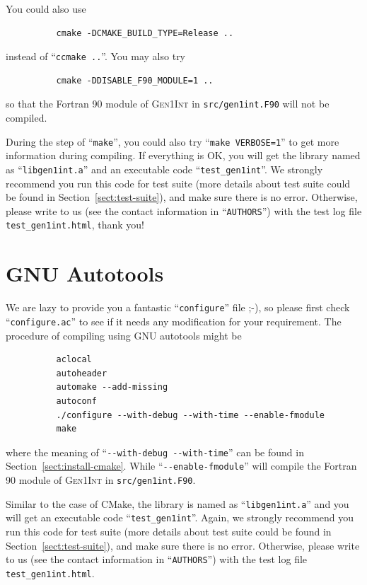 \documentclass[a4paper,11pt,twoside,openright]{book}
\begin{document}
You could also use 
\begin{verbatim}
          cmake -DCMAKE_BUILD_TYPE=Release ..
\end{verbatim}
instead of ``\verb|ccmake ..|''. You may also try
\begin{verbatim}
          cmake -DDISABLE_F90_MODULE=1 ..
\end{verbatim}
so that the Fortran 90 module of \textsc{Gen1Int} in \verb|src/gen1int.F90| will not be compiled.

During the step of ``\verb|make|'', you could also try ``\verb|make VERBOSE=1|'' to get more information
during compiling. If everything is OK, you will get the library named as ``\verb|libgen1int.a|'' and an executable
code ``\verb|test_gen1int|''. We strongly recommend you run this code for test suite (more details about
test suite could be found in Section~\ref{sect:test-suite}), and make sure there is no error. Otherwise,
please write to us (see the contact information in ``\verb|AUTHORS|'') with the test log file
\verb|test_gen1int.html|, thank you!

\section{GNU Autotools}
\label{sect:install-gnu}

We are lazy to provide you a fantastic ``\verb|configure|'' file ;-), so please first check ``\verb|configure.ac|'' to
see if it needs any modification for your requirement. The procedure of compiling using GNU autotools might be
\begin{verbatim}
          aclocal
          autoheader
          automake --add-missing
          autoconf
          ./configure --with-debug --with-time --enable-fmodule
          make
\end{verbatim}
where the meaning of ``\verb|--with-debug --with-time|'' can be found in Section~\ref{sect:install-cmake}.
While ``\verb|--enable-fmodule|'' will compile the Fortran 90 module of \textsc{Gen1Int} in \verb|src/gen1int.F90|.

Similar to the case of CMake, the library is named as ``\verb|libgen1int.a|'' and you will get an executable
code ``\verb|test_gen1int|''. Again, we strongly recommend you run this code for test suite (more details about
test suite could be found in Section~\ref{sect:test-suite}), and make sure there is no error. Otherwise,
please write to us (see the contact information in ``\verb|AUTHORS|'') with the test log file
\verb|test_gen1int.html|.
\end{document}
